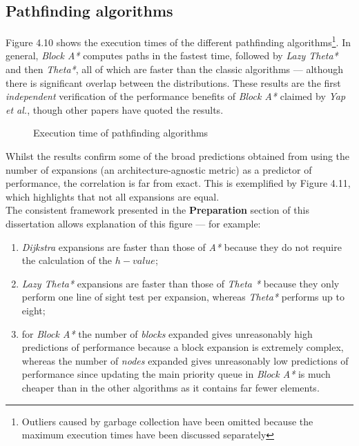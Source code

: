\documentclass[12pt,notitlepage]{report}
\begin{document}
\subsection{Pathfinding algorithms}
Figure 4.10 shows the execution times of the different pathfinding algorithms\footnote{Outliers caused by garbage collection have been omitted because the maximum execution times have been discussed separately}. In general, {\em Block A*} computes paths in the fastest time, followed by {\em Lazy Theta*} and then {\em Theta*}, all of which are faster than the classic algorithms --- although there is significant overlap between the distributions. These results are the first {\em independent} verification of the performance benefits of {\em Block A*} claimed by {\em Yap et al.}, though other papers have quoted the results\cite{Nash12}\cite{Nash13}.\\

\begin{figure}
\centering

\caption{Execution time of pathfinding algorithms}
\end{figure}

\noindent 
Whilst the results confirm some of the broad predictions obtained from using the number of expansions (an architecture-agnostic metric) as a predictor of performance, the correlation is far from exact. This is exemplified by Figure 4.11, which highlights that not all expansions are equal.\\

\noindent
The consistent framework presented in the {\bfseries Preparation} section of this dissertation allows explanation of this figure --- for example:
\begin{enumerate}
\item {\em Dijkstra} expansions are faster than those of {\em A*} because they do not require the calculation of the $h-value$;
\item {\em Lazy Theta*} expansions are faster than those of {\em Theta *} because they only perform one line of sight test per expansion, whereas {\em Theta*} performs up to eight;
\item for {\em Block A*} the number of {\em blocks} expanded gives unreasonably high predictions of performance because a block expansion is extremely complex, whereas the number of {\em nodes} expanded gives unreasonably low predictions of performance since updating the main priority queue in {\em Block A*} is much cheaper than in the other algorithms as it contains far fewer elements.
\end{enumerate}
\end{document}
